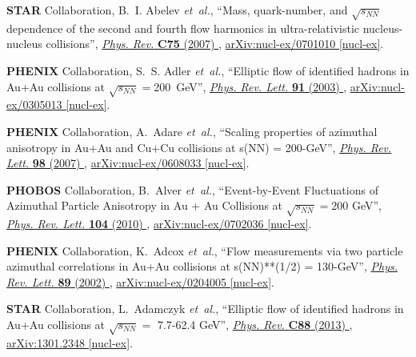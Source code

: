 \documentclass[ALICE,manyauthors]{cernphprep}
\begin{document}
\begin{thebibliography}{10}
{\bfseries STAR} Collaboration, B.~I. Abelev {\em et~al.}, ``{Mass,
  quark-number, and $\sqrt{s_{NN}}$ dependence of the second and fourth flow
  harmonics in ultra-relativistic nucleus-nucleus collisions}'',
  \href{http://dx.doi.org/10.1103/PhysRevC.75.054906}{{\em Phys. Rev.}
  {\bfseries C75} (2007) },
\href{http://arxiv.org/abs/nucl-ex/0701010}{{\ttfamily arXiv:nucl-ex/0701010
  [nucl-ex]}}.

{\bfseries PHENIX} Collaboration, S.~S. Adler {\em et~al.}, ``{Elliptic flow of
  identified hadrons in Au+Au collisions at $\sqrt{s_{NN}} = $200~GeV}'',
  \href{http://dx.doi.org/10.1103/PhysRevLett.91.182301}{{\em Phys. Rev. Lett.}
  {\bfseries 91} (2003) },
\href{http://arxiv.org/abs/nucl-ex/0305013}{{\ttfamily arXiv:nucl-ex/0305013
  [nucl-ex]}}.

{\bfseries PHENIX} Collaboration, A.~Adare {\em et~al.}, ``{Scaling properties
  of azimuthal anisotropy in Au+Au and Cu+Cu collisions at s(NN) = 200-GeV}'',
  \href{http://dx.doi.org/10.1103/PhysRevLett.98.162301}{{\em Phys. Rev. Lett.}
  {\bfseries 98} (2007) },
\href{http://arxiv.org/abs/nucl-ex/0608033}{{\ttfamily arXiv:nucl-ex/0608033
  [nucl-ex]}}.

{\bfseries PHOBOS} Collaboration, B.~Alver {\em et~al.}, ``{Event-by-Event
  Fluctuations of Azimuthal Particle Anisotropy in Au + Au Collisions at
  $\sqrt{s_{NN}}= 200$ GeV}'',
  \href{http://dx.doi.org/10.1103/PhysRevLett.104.142301}{{\em Phys. Rev.
  Lett.} {\bfseries 104} (2010) },
\href{http://arxiv.org/abs/nucl-ex/0702036}{{\ttfamily arXiv:nucl-ex/0702036
  [nucl-ex]}}.

{\bfseries PHENIX} Collaboration, K.~Adcox {\em et~al.}, ``{Flow measurements
  via two particle azimuthal correlations in Au+Au collisions at s(NN)**(1/2) =
  130-GeV}'', \href{http://dx.doi.org/10.1103/PhysRevLett.89.212301}{{\em Phys.
  Rev. Lett.} {\bfseries 89} (2002) },
\href{http://arxiv.org/abs/nucl-ex/0204005}{{\ttfamily arXiv:nucl-ex/0204005
  [nucl-ex]}}.

{\bfseries STAR} Collaboration, L.~Adamczyk {\em et~al.}, ``{Elliptic flow of
  identified hadrons in Au+Au collisions at $\sqrt{s_{NN}}=$ 7.7-62.4 GeV}'',
  \href{http://dx.doi.org/10.1103/PhysRevC.88.014902}{{\em Phys. Rev.}
  {\bfseries C88} (2013) },
\href{http://arxiv.org/abs/1301.2348}{{\ttfamily arXiv:1301.2348 [nucl-ex]}}.


\end{thebibliography}
\end{document}
